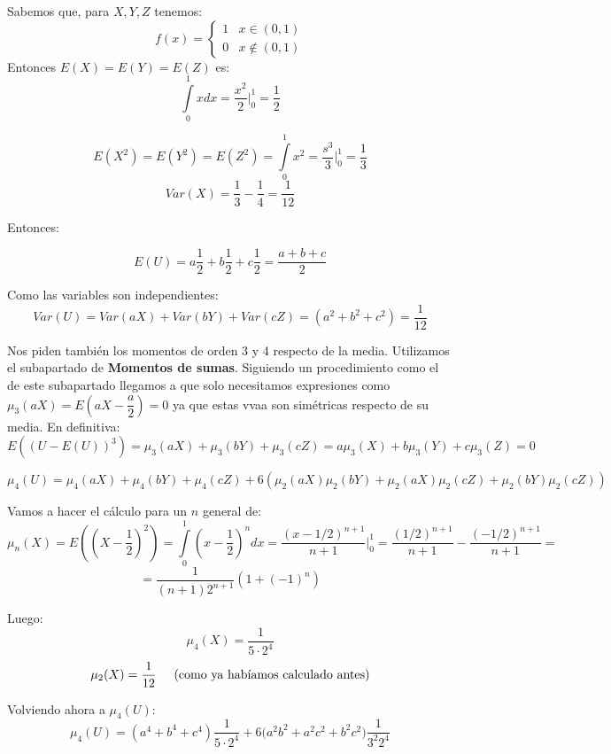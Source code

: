 \documentclass[openany]{book}
\begin{document}
\begin{exercise}
    $  $\\
    Sabemos que, para $ X,Y,Z $ tenemos:
    $$ f(x)=
    \left\{
    \begin{array}{lr}
        1 & x \in (0,1)\\
        0 & x \not \in (0,1)
    \end{array}
    \right.
    $$
    Entonces $ E(X)=E(Y)=E(Z)  $ es:
    $$ \int\limits_{0}^{1} xdx = \dfrac{x^2}{2} \Biggr|_{0}^{1} = \dfrac{1}{2} $$

    $$ E(X^2) = E(Y^2) = E(Z^2) = \int\limits_{0}^{1} x ^2 = \dfrac{s^3}{3} \Biggr|_{0}^{1} = \dfrac{1}{3}$$
    $$ Var(X)=\dfrac{1}{3}-\dfrac{1}{4} = \dfrac{1}{12} $$

    Entonces:

    $$ E(U) = a \dfrac{1}{2}+b \dfrac{1}{2} +c \dfrac{1}{2} = \dfrac{a+b+c}{2} $$
    
    Como las variables son independientes:
    $$ Var(U) = Var(aX)+Var(bY) + Var(cZ) = (a^2+b^2+c^2) = \dfrac{1}{12} $$

    Nos piden también los momentos de orden 3 y 4 respecto de la media. Utilizamos el subapartado de \textbf{Momentos de sumas}. Siguiendo un procedimiento como el de este subapartado llegamos a que solo necesitamos expresiones como $ \mu_{3}(aX) = E\left(aX-\dfrac{a}{2}\right) = 0 $ ya que estas vvaa son simétricas respecto de su media. En definitiva:
    $$ E((U-E(U))^3) = \mu_{3}(aX)+\mu_{3}(bY)+\mu_{3}(cZ) = a \mu_{3}(X) + b \mu_{3}(Y) + c\mu_{3}(Z) = 0 $$

    $$ \mu_{4}(U) = \mu_{4}(aX) + \mu_{4}(bY) + \mu_{4}(cZ) + 6(\mu_{2}(aX)\mu_{2}(bY)+\mu_{2}(aX)\mu_{2}(cZ) + \mu_{2}(bY)\mu_{2}(cZ)) $$
    
    Vamos a hacer el cálculo para un $ n $ general de:
    $$ \mu_{n}(X) = E\left( \left( X-\dfrac{1}{2}   \right)^2\right) = \int\limits_{0}^{1} \left( x-\dfrac{1}{2} \right) ^{n} dx = \dfrac{(x-1/2)^{n+1}}{n+1} \Biggr|_{0}^{1} = \dfrac{(1/2)^{n+1}}{n+1}-\dfrac{(-1/2)^{n+1}}{n+1} =$$
    $$ = \dfrac{1}{(n+1)2^{n+1}} (1+(-1)^{n}) $$

    Luego:
    $$ \mu_{4}(X) = \dfrac{1}{5\cdot 2^{4}} $$
    $$ \mu_{2}(X) = \dfrac{1}{12} \hspace{5mm} \text{(como ya habíamos calculado antes)} $$

    Volviendo ahora a $ \mu_{4}(U) $:
    $$ \mu_{4}(U) =  (a^{4}+b^{4}+c^{4})\dfrac{1}{5\cdot 2^{4}} + 6 \Big(a^2b^2+a^2c^2+b^2c^2 \Big ) \dfrac{1}{3^2 2^{4}}$$


\end{exercise}
\end{document}
